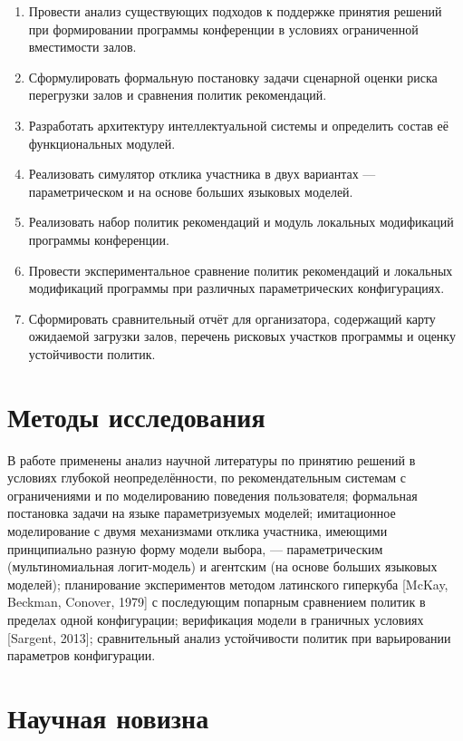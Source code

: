 \begin{enumerate}
\item Провести анализ существующих подходов к поддержке принятия решений при формировании программы конференции в условиях ограниченной вместимости залов.
\item Сформулировать формальную постановку задачи сценарной оценки риска перегрузки залов и сравнения политик рекомендаций.
\item Разработать архитектуру интеллектуальной системы и определить состав её функциональных модулей.
\item Реализовать симулятор отклика участника в двух вариантах --- параметрическом и на основе больших языковых моделей.
\item Реализовать набор политик рекомендаций и модуль локальных модификаций программы конференции.
\item Провести экспериментальное сравнение политик рекомендаций и локальных модификаций программы при различных параметрических конфигурациях.
\item Сформировать сравнительный отчёт для организатора, содержащий карту ожидаемой загрузки залов, перечень рисковых участков программы и оценку устойчивости политик.
\end{enumerate}


\section*{Методы исследования}

В работе применены анализ научной литературы по принятию решений в условиях глубокой неопределённости, по рекомендательным системам с ограничениями и по моделированию поведения пользователя; формальная постановка задачи на языке параметризуемых моделей; имитационное моделирование с двумя механизмами отклика участника, имеющими принципиально разную форму модели выбора, --- параметрическим (мультиномиальная логит-модель) и агентским (на основе больших языковых моделей); планирование экспериментов методом латинского гиперкуба [McKay, Beckman, Conover, 1979] с последующим попарным сравнением политик в пределах одной конфигурации; верификация модели в граничных условиях [Sargent, 2013]; сравнительный анализ устойчивости политик при варьировании параметров конфигурации.


\section*{Научная новизна}

